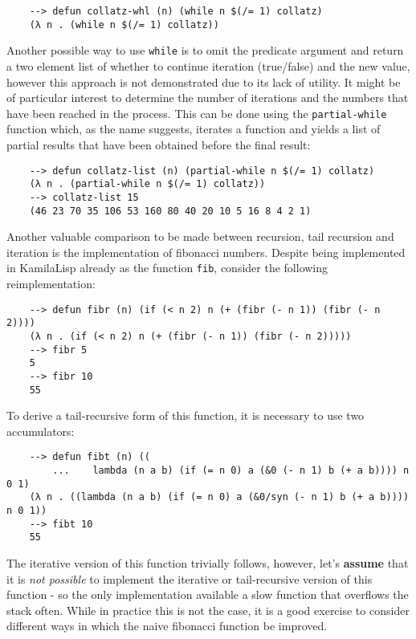 \begin{Verbatim}
    --> defun collatz-whl (n) (while n $(/= 1) collatz)
    (λ n . (while n $(/= 1) collatz))
\end{Verbatim}

Another possible way to use \verb|while| is to omit the predicate argument and return a two element list of whether to continue iteration (true/false) and the new value, however this approach is not demonstrated due to its lack of utility. It might be of particular interest to determine the number of iterations and the numbers that have been reached in the process. This can be done using the \verb|partial-while| function which, as the name suggests, iterates a function and yields a list of partial results that have been obtained before the final result:

\begin{Verbatim}
    --> defun collatz-list (n) (partial-while n $(/= 1) collatz)
    (λ n . (partial-while n $(/= 1) collatz))
    --> collatz-list 15
    (46 23 70 35 106 53 160 80 40 20 10 5 16 8 4 2 1)
\end{Verbatim}

Another valuable comparison to be made between recursion, tail recursion and iteration is the implementation of fibonacci numbers. Despite being implemented in KamilaLisp already as the function \verb|fib|, consider the following reimplementation:

\begin{Verbatim}
    --> defun fibr (n) (if (< n 2) n (+ (fibr (- n 1)) (fibr (- n 2))))
    (λ n . (if (< n 2) n (+ (fibr (- n 1)) (fibr (- n 2)))))
    --> fibr 5
    5
    --> fibr 10
    55
\end{Verbatim}

To derive a tail-recursive form of this function, it is necessary to use two accumulators:

\begin{Verbatim}
    --> defun fibt (n) ((
        ...    lambda (n a b) (if (= n 0) a (&0 (- n 1) b (+ a b)))) n 0 1)
    (λ n . ((lambda (n a b) (if (= n 0) a (&0/syn (- n 1) b (+ a b)))) n 0 1))
    --> fibt 10
    55
\end{Verbatim}

The iterative version of this function trivially follows, however, let's \textbf{assume} that it is \textit{not possible} to implement the iterative or tail-recursive version of this function - so the only implementation available a slow function that overflows the stack often. While in practice this is not the case, it is a good exercise to consider different ways in which the naive fibonacci function be improved.


